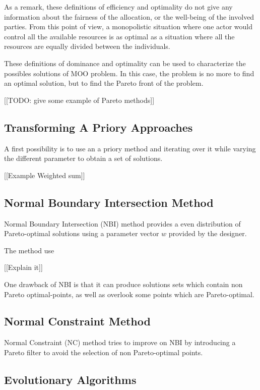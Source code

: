 As a remark, these definitions of efficiency and optimality do not give any information about the fairness of the allocation, or the well-being of the involved parties. From this point of view, a monopolistic situation where one actor would control all the available resources is as optimal as a situation where all the resources are equally divided between the individuals.

These definitions of dominance and optimality can be used to characterize the possibles solutions of MOO problem. In this case, the problem is no more to find an optimal solution, but to find the Pareto front of the problem.

[[TODO: give some example of Pareto methods]]

\subsection{Transforming A Priory Approaches}

A first possibility is to use an a priory method and iterating over it while varying the different parameter to obtain a set of solutions.

[[Example Weighted sum]]

\subsection{Normal Boundary Intersection Method}

Normal Boundary Intersection (NBI)\cite{S1052623496307510} method provides a even distribution of Pareto-optimal solutions using a parameter vector $w$ provided by the designer.

The method use 

[[Explain it]]

One drawback of NBI is that it can produce solutions sets which contain non Pareto optimal-points, as well as overlook some points which are Pareto-optimal.

\subsection{Normal Constraint Method}

Normal Constraint (NC) method tries to improve on NBI by introducing a Pareto filter to avoid the selection of non Pareto-optimal points.

\subsection{Evolutionary Algorithms}

